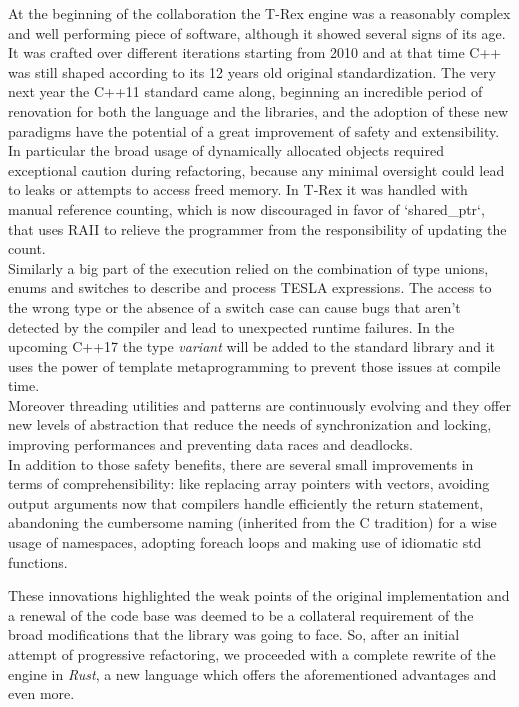 At the beginning of the collaboration the T-Rex engine was a reasonably complex and well performing piece of software, although it showed several signs of its age. It was crafted over different iterations starting from 2010 and at that time C++ was still shaped according to its 12 years old original standardization. The very next year the C++11 standard came along, beginning an incredible period of renovation for both the language and the libraries, and the adoption of these new paradigms have the potential of a great improvement of safety and extensibility.\\
In particular the broad usage of dynamically allocated objects required exceptional caution during refactoring, because any minimal oversight could lead to leaks or attempts to access freed memory. In T-Rex it was handled with manual reference counting, which is now discouraged in favor of `shared_ptr`, that uses RAII to relieve the programmer from the responsibility of updating the count.\\
Similarly a big part of the execution relied on the combination of type unions, enums and switches to describe and process TESLA expressions. The access to the wrong type or the absence of a switch case can cause bugs that aren't detected by the compiler and lead to unexpected runtime failures. In the upcoming C++17 the type \emph{variant} will be added to the standard library and it uses the power of template metaprogramming to prevent those issues at compile time.\\
Moreover threading utilities and patterns are continuously evolving and they offer new levels of abstraction that reduce the needs of synchronization and locking, improving performances and preventing data races and deadlocks.\\
In addition to those safety benefits, there are several small improvements in terms of comprehensibility: like replacing array pointers with vectors, avoiding output arguments now that compilers handle efficiently the return statement, abandoning the cumbersome naming (inherited from the C tradition) for a wise usage of namespaces, adopting foreach loops and making use of idiomatic std functions.

These innovations highlighted the weak points of the original implementation and a renewal of the code base was deemed to be a collateral requirement of the broad modifications that the library was going to face. So, after an initial attempt of progressive refactoring, we proceeded with a complete rewrite of the engine in \emph{Rust}, a new language which offers the aforementioned advantages and even more.

